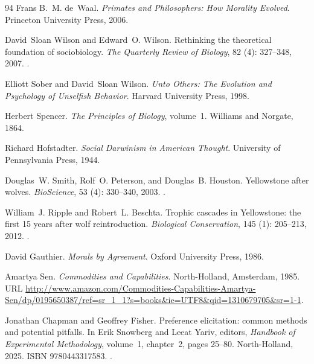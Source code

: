 \documentclass[11pt]{article}
\theoremstyle{plain}
\theoremstyle{definition}
\theoremstyle{remark}
\begin{document}
\begin{thebibliography}{94}
Frans B.~M. de~Waal.
\newblock \emph{Primates and Philosophers: How Morality Evolved}.
\newblock Princeton University Press, 2006.

David~Sloan Wilson and Edward~O. Wilson.
\newblock Rethinking the theoretical foundation of sociobiology.
\newblock \emph{The Quarterly Review of Biology}, 82 (4):
  327--348, 2007.
\newblock {}.

Elliott Sober and David~Sloan Wilson.
\newblock \emph{Unto Others: The Evolution and Psychology of Unselfish
  Behavior}.
\newblock Harvard University Press, 1998.

Herbert Spencer.
\newblock \emph{The Principles of Biology}, volume~1.
\newblock Williams and Norgate, 1864.

Richard Hofstadter.
\newblock \emph{Social {Darwinism} in {American} Thought}.
\newblock University of Pennsylvania Press, 1944.

Douglas~W. Smith, Rolf~O. Peterson, and Douglas~B. Houston.
\newblock Yellowstone after wolves.
\newblock \emph{BioScience}, 53 (4): 330--340, 2003.
\newblock {}.

William~J. Ripple and Robert~L. Beschta.
\newblock Trophic cascades in {Yellowstone}: the first 15 years after wolf
  reintroduction.
\newblock \emph{Biological Conservation}, 145 (1): 205--213,
  2012.
\newblock {}.

David Gauthier.
\newblock \emph{Morals by Agreement}.
\newblock Oxford University Press, 1986.

Amartya Sen.
\newblock \emph{Commodities and Capabilities}.
\newblock North-Holland, Amsterdam, 1985.
\newblock URL
  \url{http://www.amazon.com/Commodities-Capabilities-Amartya-Sen/dp/0195650387/ref=sr_1_1?s=books\&ie=UTF8\&qid=1310679705\&sr=1-1}.

Jonathan Chapman and Geoffrey Fisher.
\newblock Preference elicitation: common methods and potential pitfalls.
\newblock In Erik Snowberg and Leeat Yariv, editors, \emph{Handbook of
  Experimental Methodology}, volume~1, chapter~2, pages 25--80. North-Holland,
  2025.
\newblock ISBN 9780443317583.
\newblock {}.


\end{thebibliography}
\end{document}
